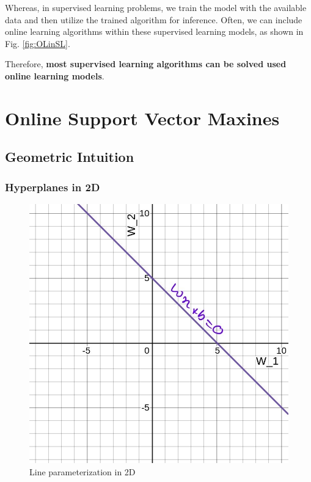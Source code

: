 \documentclass[11pt]{article}
\begin{document}
Whereas, in supervised learning problems, we train the model with the available data and then utilize the trained algorithm for inference. Often, we can include online learning algorithms within these supervised learning models, as shown in Fig. \ref{fig:OLinSL}.

Therefore, \textbf{most supervised learning algorithms can be solved used online learning models}.

\section{Online Support Vector Maxines}

\subsection{Geometric Intuition}
\subsubsection{Hyperplanes in 2D}

\begin{figure}[h]
    \centering
    \includegraphics[scale = 0.40]{figures/lineParameterization.jpg}
    \caption{Line parameterization in 2D}
    \label{fig:2DParameterization}
\end{figure}
\end{document}
